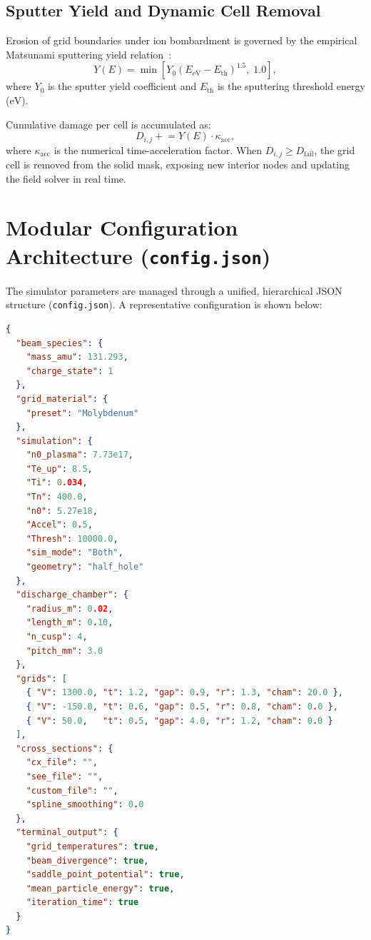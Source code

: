 \documentclass[11pt,a4paper]{article}
\begin{document}
\subsection{Sputter Yield and Dynamic Cell Removal}

Erosion of grid boundaries under ion bombardment is governed by the empirical Matsunami sputtering yield relation~\cite{matsunami}:
\begin{equation}
    Y(E) = \min\!\left[Y_0 \left(E_{\mathrm{eV}} - E_{\mathrm{th}}\right)^{1.5},\; 1.0\right],
\end{equation}
where $Y_0$ is the sputter yield coefficient and $E_{\mathrm{th}}$ is the sputtering threshold energy ($\si{\eV}$).

Cumulative damage per cell is accumulated as:
\begin{equation}
    D_{i,j} \mathrel{+}= Y(E) \cdot \kappa_{\mathrm{acc}},
\end{equation}
where $\kappa_{\mathrm{acc}}$ is the numerical time-acceleration factor. When $D_{i,j} \ge D_{\mathrm{fail}}$, the grid cell is removed from the solid mask, exposing new interior nodes and updating the field solver in real time.

\section{Modular Configuration Architecture (\texttt{config.json})}

The simulator parameters are managed through a unified, hierarchical JSON structure (\texttt{config.json}). A representative configuration is shown below:

\begin{lstlisting}[language=json,caption={Standard \texttt{config.json} structure}]
{
  "beam_species": {
    "mass_amu": 131.293,
    "charge_state": 1
  },
  "grid_material": {
    "preset": "Molybdenum"
  },
  "simulation": {
    "n0_plasma": 7.73e17,
    "Te_up": 8.5,
    "Ti": 0.034,
    "Tn": 400.0,
    "n0": 5.27e18,
    "Accel": 0.5,
    "Thresh": 10000.0,
    "sim_mode": "Both",
    "geometry": "half_hole"
  },
  "discharge_chamber": {
    "radius_m": 0.02,
    "length_m": 0.10,
    "n_cusp": 4,
    "pitch_mm": 3.0
  },
  "grids": [
    { "V": 1300.0, "t": 1.2, "gap": 0.9, "r": 1.3, "cham": 20.0 },
    { "V": -150.0, "t": 0.6, "gap": 0.5, "r": 0.8, "cham": 0.0 },
    { "V": 50.0,   "t": 0.5, "gap": 4.0, "r": 1.2, "cham": 0.0 }
  ],
  "cross_sections": {
    "cx_file": "",
    "see_file": "",
    "custom_file": "",
    "spline_smoothing": 0.0
  },
  "terminal_output": {
    "grid_temperatures": true,
    "beam_divergence": true,
    "saddle_point_potential": true,
    "mean_particle_energy": true,
    "iteration_time": true
  }
}
\end{lstlisting}
\end{document}
